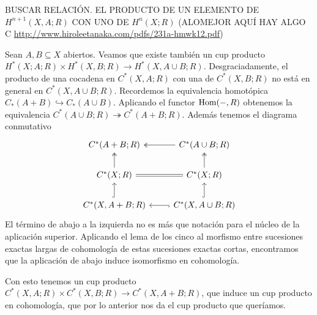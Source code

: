 \documentclass[TA.tex]{subfiles}
\begin{document}
BUSCAR RELACIÓN. EL PRODUCTO DE UN ELEMENTO DE $H^{n+1}(X,A;R)$ CON UNO DE $H^n(X;R)$ (ALOMEJOR AQUÍ HAY ALGO C \url{http://www.hiroleetanaka.com/pdfs/231a-hmwk12.pdf})

Sean $A,B\subseteq X$ abiertos. Veamos que existe también un cup producto $H^*(X;A;R)\times H^*(X,B;R)\to H^*(X,A\cup B;R)$. Desgraciadamente, el producto de una cocadena en $C^*(X,A;R)$ con una de $C^*(X,B;R)$ no está en general en $C^*(X,A\cup B;R)$. Recordemos la equivalencia homotópica $C_*(A+B)\hookrightarrow C_*(A\cup B)$. Aplicando el functor $\operatorname{Hom}(-,R)$ obtenemos la equivalencia $C^*(A\cup B;R)\twoheadrightarrow C^*(A+B;R)$. Además tenemos el diagrama conmutativo
\[
\begin{tikzcd}
C^*(A+B;R) & C^*(A\cup B;R)\arrow[l, twoheadrightarrow]\\
C^*(X;R)\arrow[u, twoheadrightarrow]\arrow[r, equals] & C^*(X;R)\arrow[u, twoheadrightarrow]\\
C^*(X,A+B;R)\arrow[u, hookrightarrow] & C^*(X,A\cup B;R)\arrow[l, hookrightarrow]\arrow[u, hookrightarrow]
\end{tikzcd}
\]
El término de abajo a la izquierda no es más que notación para el núcleo de la aplicación superior. Aplicando el lema de los cinco al morfismo entre sucesiones exactas largas de cohomología de estas sucesiones exactas cortas, encontramos que la aplicación de abajo induce isomorfismo en cohomología. 

Con esto tenemos un cup producto $C^*(X,A;R)\times C^*(X,B;R)\to C^*(X,A+B;R)$, que induce un cup producto en cohomología, que por lo anterior nos da el cup producto que queríamos. 
\end{document}
